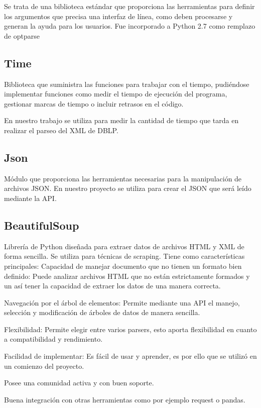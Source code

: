 \documentclass[a4paper, 12pt]{book}
\begin{document}
Se trata de una biblioteca estándar que proporciona las herramientas para definir los argumentos que precisa una interfaz de línea, como deben procesarse y generan la ayuda para los usuarios. Fue incorporado a Python 2.7 como remplazo de optparse

\subsection{Time}

Biblioteca que suministra las funciones para trabajar con el tiempo, pudiéndose implementar funciones como medir el tiempo de ejecución del programa, gestionar marcas de tiempo o incluir retrasos en el código.

En nuestro trabajo se utiliza para medir la cantidad de tiempo que tarda en realizar el parseo del XML de DBLP.

\subsection{Json}

Módulo que proporciona las herramientas necesarias para la manipulación de archivos JSON. En nuestro proyecto se utiliza para crear el JSON que será leído mediante la API.

\subsection{BeautifulSoup}
Librería de Python diseñada para extraer datos de archivos HTML y XML de forma sencilla. Se utiliza para técnicas de scraping.
Tiene como características principales:
Capacidad de manejar documento que no tienen un formato bien definido: Puede analizar archivos HTML que no están estrictamente formados y un así tener la capacidad de extraer los datos de una manera correcta.

Navegación por el árbol de elementos: Permite mediante una API el manejo, selección y modificación de árboles de datos de manera sencilla.

Flexibilidad: Permite elegir entre varios parsers, esto aporta flexibilidad en cuanto a compatibilidad y rendimiento.

Facilidad de implementar: Es fácil de usar y aprender, es por ello que se utilizó en un comienzo del proyecto.

Posee una comunidad activa y con buen soporte.

Buena integración con otras herramientas como por ejemplo request o pandas.
\end{document}
